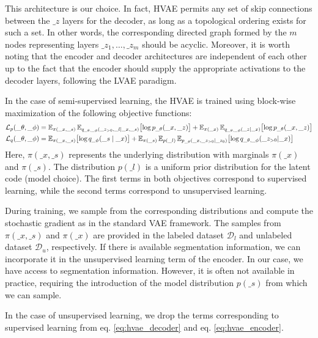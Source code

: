 This architecture is our choice. In fact, HVAE permits any set of skip connections between the $\_z$ layers for the decoder, as long as a topological ordering exists 
for such a set. In other words, the corresponding directed graph formed by the $m$ nodes representing layers $\_z_1,\dots,\_z_m$ should be acyclic. 
Moreover, it is worth noting that the encoder and decoder architectures are independent of each other up to the fact that the encoder 
should supply the appropriate activations to the decoder layers, following the LVAE paradigm. 

In the case of semi-supervised learning, the HVAE is trained using block-wise maximization of the following objective functions:
\begin{align}
    \mathcal{L}_{p}(\_\theta,\_\phi) &= 
        \operatorname{\mathbb{E}}_{\pi(\_x,\_s)}\operatorname{\mathbb{E}}_{q_{\_\theta,\_\phi}(\_z_{>0},\_l \mid \_x, \_s)}\bigl[\log p_{\_\theta}(\_x,\_z)\bigr]+
        \operatorname{\mathbb{E}}_{\pi(\_x)}\operatorname{\mathbb{E}}_{q_{\_\theta,\_\phi}(\_z \mid \_x)} \bigl[\log p_{\_\theta}(\_x,\_z)\bigr] \label{eq:hvae_decoder}\\
    \mathcal{L}_{q}(\_\theta,\_\phi) &=
        \operatorname{\mathbb{E}}_{\pi(\_x,\_s)}\bigl[\log q_{\_\phi}(\_s \mid \_x) \bigr] + 
        \operatorname{\mathbb{E}}_{\pi(\_s)}\operatorname{\mathbb{E}}_{p(\_l)}\operatorname{\mathbb{E}}_{p_{\_\theta}(\_x,\_z_{>0} \mid \_z_{0})} \bigl[\log q_{\_\theta,\_\phi}(\_z_{>0} | \_x)\bigr] \label{eq:hvae_encoder}
\end{align}
Here, $\pi(\_x,\_s)$ represents the underlying distribution with marginals $\pi(\_x)$ and $\pi(\_s)$. 
The distribution $p(\_l)$ is a uniform prior distribution for the latent code (model choice).
The first terms in both objectives correspond to supervised learning, while the second terms correspond to unsupervised learning.

During training, we sample from the corresponding distributions and compute the stochastic gradient as in the standard VAE framework. 
The samples from $\pi(\_x,\_s)$ and $\pi(\_x)$ are provided in the labeled dataset $\mathcal{D}_l$ 
and unlabeled dataset $\mathcal{D}_u$, respectively. If there is available segmentation information, we can incorporate it in 
the unsupervised learning term of the encoder. In our case, we have access to segmentation information. However, it is often not 
available in practice, requiring the introduction of the model distribution $p(\_s)$ from which we can sample.

In the case of unsupervised learning, we drop the terms corresponding to supervised learning from eq. \ref{eq:hvae_decoder} 
and eq. \ref{eq:hvae_encoder}.




